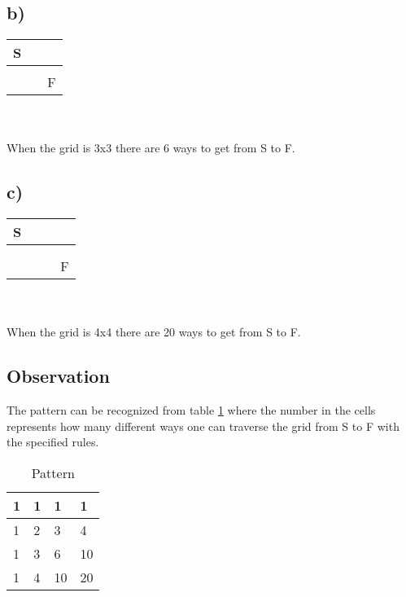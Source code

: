 \documentclass[12pt]{article}
\begin{document}
\subsection*{b)}
\begin{tabular}{|p{.3cm}|p{.3cm}|p{.3cm}|}
  \hline
  S &   &   \\
  \hline
    &   &   \\
  \hline
    &   & F \\
  \hline
\end{tabular}\\\\
When the grid is 3x3 there are 6 ways to get from S to F.

\subsection*{c)}
\begin{tabular}{|p{.3cm}|p{.3cm}|p{.3cm}|p{.3cm}|}
  \hline
  S &   &   &   \\
  \hline
    &   &   &   \\
  \hline
    &   &   &   \\
  \hline
    &   &   & F \\
  \hline
\end{tabular}\\\\
When the grid is 4x4 there are 20 ways to get from S to F.
\subsection*{Observation}
The pattern can be recognized from table \ref{tab:pattern} where the number in the cells represents how many different ways one can traverse the grid from S to F with the specified rules.
\begin{table}[h]
  \centering
  \begin{tabular}{|p{.4cm}|p{.4cm}|p{.4cm}|p{.4cm}|}
    \hline
    1 & 1 & 1 & 1 \\
    \hline
    1 & 2 & 3 & 4 \\
    \hline
    1 & 3 & 6 & 10 \\
    \hline
    1 & 4 & 10 & 20\\
    \hline
  \end{tabular}
  \caption{Pattern}
  \label{tab:pattern}
\end{table}
\end{document}
